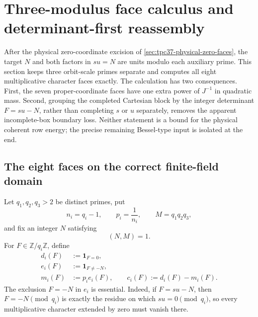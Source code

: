 \section{Three-modulus face calculus and determinant-first reassembly}
\label{sec:tpc37-three-modulus}

After the physical zero-coordinate excision of
\cref{sec:tpc37-physical-zero-faces}, the target \(N\) and both factors
in \(su=N\) are units modulo each auxiliary prime.  This section keeps
three orbit-scale primes separate and computes all eight multiplicative
character faces exactly.  The calculation has two consequences.  First,
the seven proper-coordinate faces have one extra power of \(J^{-1}\) in
quadratic mass.  Second, grouping the completed Cartesian block by the
integer determinant \(F=su-N\), rather than completing \(s\) or \(u\)
separately, removes the apparent incomplete-box boundary loss.  Neither
statement is a bound for the physical coherent row energy; the precise
remaining Bessel-type input is isolated at the end.

\subsection{The eight faces on the correct finite-field domain}

Let \(q_1,q_2,q_3>2\) be distinct primes, put
\begin{equation}
 n_i=q_i-1,
 \qquad p_i=\frac1{n_i},
 \qquad M=q_1q_2q_3,
 \label{eq:tpc37-three-modulus-data}
\end{equation}
and fix an integer \(N\) satisfying
\begin{equation}
 (N,M)=1.
 \label{eq:tpc37-N-unit}
\end{equation}
For \(F\in\mathbb Z/q_i\mathbb Z\), define
\begin{align}
 d_i(F)&:=\mathbf 1_{F=0},
 \label{eq:tpc37-coordinate-delta}\\
 e_i(F)&:=\mathbf 1_{F\ne-N},
 \label{eq:tpc37-coordinate-unit-mask}\\
 m_i(F)&:=p_i e_i(F),
 \qquad
 c_i(F):=d_i(F)-m_i(F).
 \label{eq:tpc37-principal-centered-coordinate}
\end{align}
The exclusion \(F=-N\) in \(e_i\) is essential.  Indeed, if
\(F=su-N\), then \(F=-N\pmod {q_i}\) is exactly the residue on which
\(su=0\pmod {q_i}\), so every multiplicative character extended by zero
must vanish there.

